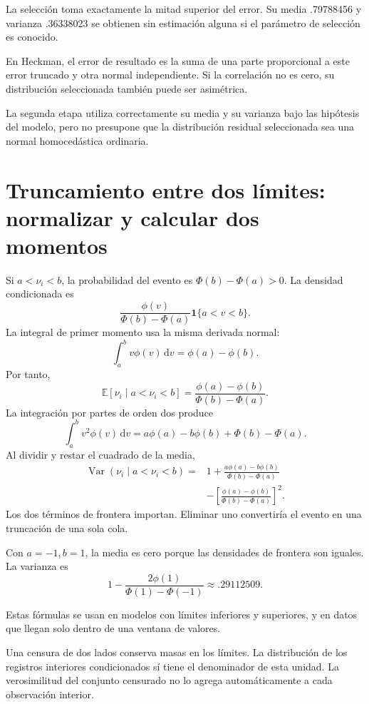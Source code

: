 \documentclass[11pt,a4paper]{article}
\newcommand{\E}{\mathbb E}
\newcommand{\dd}{\,\mathrm d}
\DeclareMathOperator{\Var}{Var}
\begin{document}
\begin{ejemplo}
La selección toma exactamente
la mitad superior del error.
Su media .79788456
y varianza .36338023
se obtienen sin estimación alguna
si el parámetro de selección es conocido.
\end{ejemplo}
En Heckman, el error de resultado
es la suma de una parte
proporcional a este error truncado
y otra normal independiente.
Si la correlación no es cero,
su distribución seleccionada
también puede ser asimétrica.

La segunda etapa utiliza correctamente
su media y su varianza
bajo las hipótesis del modelo,
pero no presupone que la
distribución residual seleccionada
sea una normal homocedástica ordinaria.


\clearpage
\section{Truncamiento entre dos límites: normalizar y calcular dos momentos}

Si \(a<\nu_i<b\), la probabilidad del evento es
\(\Phi(b)-\Phi(a)>0\).
La densidad condicionada es
\[
\frac{\phi(v)}{\Phi(b)-\Phi(a)}
\mathbf1\{a<v<b\}.
\]
La integral de primer momento
usa la misma derivada normal:
\[
\int_a^b v\phi(v)\dd v
=\phi(a)-\phi(b).
\]
Por tanto,
\[
\E[\nu_i\mid a<\nu_i<b]
=\frac{\phi(a)-\phi(b)}
{\Phi(b)-\Phi(a)}.
\]
La integración por partes de orden dos produce
\[
\int_a^b v^2\phi(v)\dd v
=a\phi(a)-b\phi(b)+\Phi(b)-\Phi(a).
\]
Al dividir y restar el cuadrado de la media,
\[
\begin{aligned}
\Var(\nu_i\mid a<\nu_i<b)
={}&1+\frac{a\phi(a)-b\phi(b)}
{\Phi(b)-\Phi(a)}\\
&-\left[\frac{\phi(a)-\phi(b)}
{\Phi(b)-\Phi(a)}\right]^2.
\end{aligned}
\]
Los dos términos de frontera importan.
Eliminar uno convertiría el evento
en una truncación de una sola cola.

\begin{ejemplo}
Con \(a=-1,b=1\), la media es cero
porque las densidades de frontera
son iguales. La varianza es
\[
1-\frac{2\phi(1)}{\Phi(1)-\Phi(-1)}
\approx.29112509.
\]
\end{ejemplo}
Estas fórmulas se usan en modelos
con límites inferiores y superiores,
y en datos que llegan solo
dentro de una ventana de valores.

Una censura de dos lados
conserva masas en los límites.
La distribución de los registros
interiores condicionados sí tiene
el denominador de esta unidad.
La verosimilitud del conjunto censurado
no lo agrega automáticamente
a cada observación interior.
\end{document}
